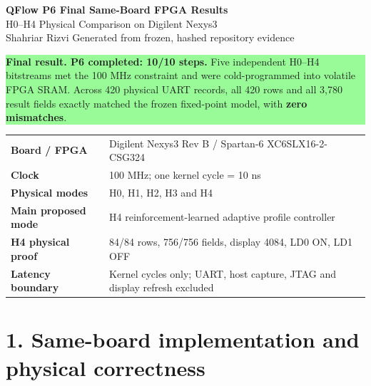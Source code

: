 \documentclass[10pt,a4paper]{article}
\newcommand{\resultbox}[2]{
  \noindent\colorbox{#1}{\parbox{0.965\linewidth}{#2}}
}
\begin{document}
\begin{center}
{\Large\bfseries\color{Navy} QFlow P6 Final Same-Board FPGA Results}\\[4pt]
{\large H0--H4 Physical Comparison on Digilent Nexys3}\\[6pt]
Shahriar Rizvi \hfill Generated from frozen, hashed repository evidence
\end{center}

\resultbox{PaleGreen}{
\textbf{Final result. P6 completed: 10/10 steps.} Five independent H0--H4 bitstreams met the
100 MHz constraint and were cold-programmed into volatile FPGA SRAM.
Across 420 physical UART records, all 420 rows and all 3,780 result
fields exactly matched the frozen fixed-point model, with
\textbf{zero mismatches}.
}

\vspace{5pt}
\begin{tabularx}{\textwidth}{>{\bfseries}p{3.8cm}X}
Board / FPGA & Digilent Nexys3 Rev B / Spartan-6 XC6SLX16-2-CSG324 \\
Clock & 100 MHz; one kernel cycle = 10 ns \\
Physical modes & H0, H1, H2, H3 and H4 \\
Main proposed mode & H4 reinforcement-learned adaptive profile controller \\
H4 physical proof & 84/84 rows, 756/756 fields, display 4084, LD0 ON, LD1 OFF \\
Latency boundary & Kernel cycles only; UART, host capture, JTAG and display refresh excluded \\
\end{tabularx}

\section*{1. Same-board implementation and physical correctness}

\begin{table}[H]
\centering
\scriptsize
{}
\caption{Independent implementations using the same board, clock constraint,
replay order, fixed-point contract and physical result shell.}
\end{table}
\end{document}
